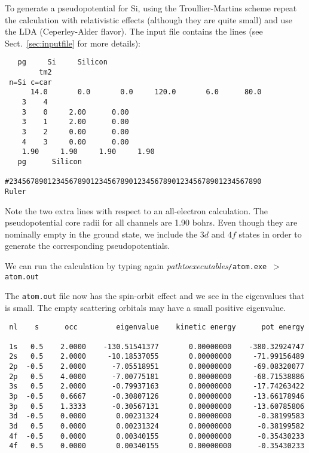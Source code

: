 \documentclass[11pt]{article}
\begin{document}
To generate a pseudopotential for Si, using
the Troullier-Martins scheme repeat the calculation with relativistic
effects (although they are quite small) and
use the LDA (Ceperley-Alder flavor). The input file
contains the lines (see Sect.~\ref{sec:inputfile} for more
details):

\begin{verbatim}
   pg     Si     Silicon
        tm2
 n=Si c=car
      14.0       0.0       0.0     120.0       6.0      80.0
    3    4
    3    0     2.00      0.00
    3    1     2.00      0.00
    3    2     0.00      0.00
    4    3     0.00      0.00
    1.90     1.90     1.90     1.90
   pg      Silicon

#23456789012345678901234567890123456789012345678901234567890      Ruler
\end{verbatim}

Note the two extra lines with respect to an all-electron calculation.
The pseudopotential core radii for all channels are 1.90 bohrs. Even
though they are nominally empty in the ground state, we include the
$3d$ and $4f$ states in order to generate the corresponding
pseudopotentials.

We can run the calculation by typing again
\textit{pathtoexecutables}\texttt{/atom.exe $>$ atom.out}

The {\tt atom.out} file now has the spin-orbit effect and we
see in the eigenvalues that is small.  The empty scattering orbitals
may have a small positive eigenvalue.

\begin{verbatim}
 nl    s      occ         eigenvalue    kinetic energy      pot energy

 1s   0.5    2.0000    -130.51541377       0.00000000    -380.32924747
 2s   0.5    2.0000     -10.18537055       0.00000000     -71.99156489
 2p  -0.5    2.0000      -7.05518951       0.00000000     -69.08320077
 2p   0.5    4.0000      -7.00775181       0.00000000     -68.71538886
 3s   0.5    2.0000      -0.79937163       0.00000000     -17.74263422
 3p  -0.5    0.6667      -0.30807126       0.00000000     -13.66178946
 3p   0.5    1.3333      -0.30567131       0.00000000     -13.60785806
 3d  -0.5    0.0000       0.00231324       0.00000000      -0.38199583
 3d   0.5    0.0000       0.00231324       0.00000000      -0.38199582
 4f  -0.5    0.0000       0.00340155       0.00000000      -0.35430233
 4f   0.5    0.0000       0.00340155       0.00000000      -0.35430233
\end{verbatim}
\end{document}
